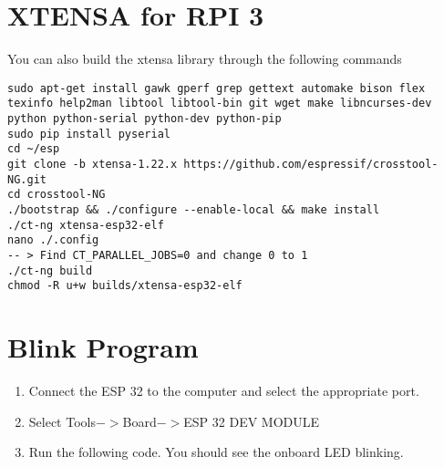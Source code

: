 \documentclass[journal,12pt,twocolumn]{IEEEtran}
\begin{document}
\section{XTENSA for RPI 3}
You can also build the xtensa library through the following commands
\begin{lstlisting}
sudo apt-get install gawk gperf grep gettext automake bison flex texinfo help2man libtool libtool-bin git wget make libncurses-dev python python-serial python-dev python-pip
sudo pip install pyserial
cd ~/esp
git clone -b xtensa-1.22.x https://github.com/espressif/crosstool-NG.git
cd crosstool-NG
./bootstrap && ./configure --enable-local && make install
./ct-ng xtensa-esp32-elf
nano ./.config
-- > Find CT_PARALLEL_JOBS=0 and change 0 to 1
./ct-ng build 
chmod -R u+w builds/xtensa-esp32-elf
\end{lstlisting}
\section{Blink Program}
\begin{enumerate}
\item Connect the ESP 32 to the computer and select the appropriate port.
\item Select Tools$->$Board$->$ESP 32 DEV MODULE
\item Run the following code.  You should see the onboard LED blinking.

\end{enumerate}
%
\end{document}
